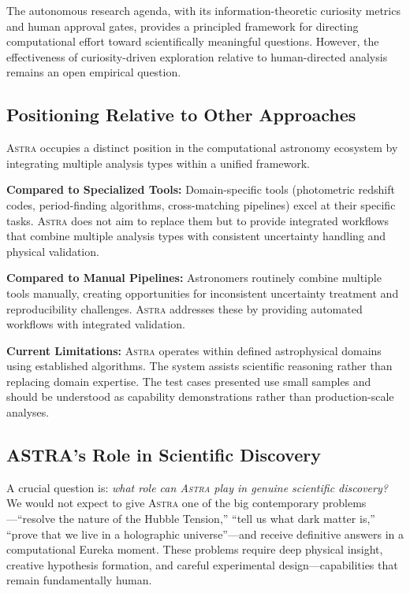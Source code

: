 \documentclass[usenatbib]{rasti}
\newcommand{\astra}{\textsc{Astra}\xspace}
\begin{document}
The autonomous research agenda, with its information-theoretic curiosity metrics and human approval gates, provides a principled framework for directing computational effort toward scientifically meaningful questions.
However, the effectiveness of curiosity-driven exploration relative to human-directed analysis remains an open empirical question.

\subsection{Positioning Relative to Other Approaches}
\label{sec:discussion:positioning}

\astra occupies a distinct position in the computational astronomy ecosystem by integrating multiple analysis types within a unified framework.

\textbf{Compared to Specialized Tools:}
Domain-specific tools (photometric redshift codes, period-finding algorithms, cross-matching pipelines) excel at their specific tasks.
\astra does not aim to replace them but to provide integrated workflows that combine multiple analysis types with consistent uncertainty handling and physical validation.

\textbf{Compared to Manual Pipelines:}
Astronomers routinely combine multiple tools manually, creating opportunities for inconsistent uncertainty treatment and reproducibility challenges.
\astra addresses these by providing automated workflows with integrated validation.

\textbf{Current Limitations:}
\astra operates within defined astrophysical domains using established algorithms.
The system assists scientific reasoning rather than replacing domain expertise.
The test cases presented use small samples and should be understood as capability demonstrations rather than production-scale analyses.

\subsection{ASTRA's Role in Scientific Discovery}
\label{sec:discussion:role}

A crucial question is: \emph{what role can \astra play in genuine scientific discovery?}
We would not expect to give \astra one of the big contemporary problems---``resolve the nature of the Hubble Tension,'' ``tell us what dark matter is,'' ``prove that we live in a holographic universe''---and receive definitive answers in a computational Eureka moment.
These problems require deep physical insight, creative hypothesis formation, and careful experimental design---capabilities that remain fundamentally human.
\end{document}

